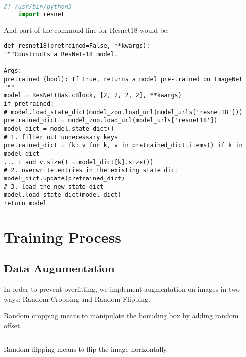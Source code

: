 \documentclass{article}
\begin{document}
\begin{file}[hello.py]
	\begin{lstlisting}[language=Python]
	#! /usr/bin/python3
	import resnet
	\end{lstlisting}
\end{file}

And part of the commond line for Resnet18 would be:
\begin{commandline}
	\begin{verbatim}
def resnet18(pretrained=False, **kwargs):
"""Constructs a ResNet-18 model.

Args:
pretrained (bool): If True, returns a model pre-trained on ImageNet
"""
model = ResNet(BasicBlock, [2, 2, 2, 2], **kwargs)
if pretrained:
# model.load_state_dict(model_zoo.load_url(model_urls['resnet18']))
pretrained_dict = model_zoo.load_url(model_urls['resnet18'])
model_dict = model.state_dict()
# 1. filter out unnecessary keys
pretrained_dict = {k: v for k, v in pretrained_dict.items() if k in model_dict 
... : and v.size() ==model_dict[k].size()}
# 2. overwrite entries in the existing state dict
model_dict.update(pretrained_dict) 
# 3. load the new state dict
model.load_state_dict(model_dict)
return model
	\end{verbatim}
\end{commandline}

\section{Training Process}
\subsection{Data Augumentation}
In order to prevent overfitting, we implement augmentation on images in two ways: Random Cropping and Random Flipping.

Random cropping means to manipulate the bonuding box by adding random offset.

\begin{commandline}
	\begin{verbatim}

	\end{verbatim}
\end{commandline}


Random filpping means to flip the image horizontally. 

\begin{commandline}
	\begin{verbatim}
	
	\end{verbatim}
\end{commandline}
\end{document}

